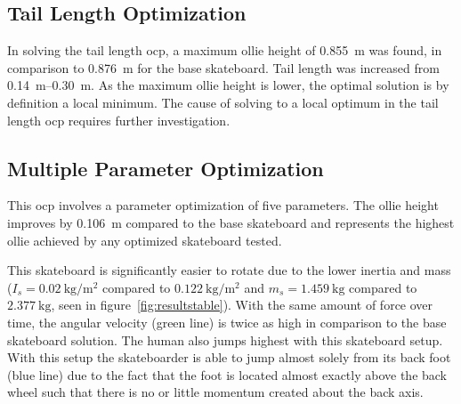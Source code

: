 \documentclass[default,iicol]{sn-jnl}
\begin{document}
\subsection{Tail Length Optimization}
In solving the tail length \gls{ocp}, a maximum ollie height of \SI{0.855}{\meter} was found, in comparison to \SI{0.876}{\meter} for the base skateboard. Tail length was increased from \SIrange{0.14}{0.30}{\meter}. As the maximum ollie height is lower, the optimal solution is by definition a local minimum.
The cause of solving to a local optimum in the tail length \gls{ocp} requires further investigation.


\subsection{Multiple Parameter Optimization}
This \gls{ocp} involves a parameter optimization of five parameters. The ollie height improves by \SI{0.106}{\meter} compared to the base skateboard and represents the highest ollie achieved by any optimized skateboard tested. 

This skateboard is significantly easier to rotate due to the lower inertia and mass ($I_s = \SI{0.02}{\kilo\gram\per\meter\squared}$ compared to $\SI{0.122}{\kilo\gram\per\meter\squared}$ and $m_s = \SI{1.459}{\kilo\gram}$ compared to $\SI{2.377}{\kilo\gram}$, seen in figure~\ref{fig:resultstable}).
With the same amount of force over time, the angular velocity (green line) is twice as high in comparison to the base skateboard solution.
The human also jumps highest with this skateboard setup.
With this setup the skateboarder is able to jump almost solely from its back foot (blue line) due to the fact that the foot is located almost exactly above the back wheel such that there is no or little momentum created about the back axis. 
\end{document}
